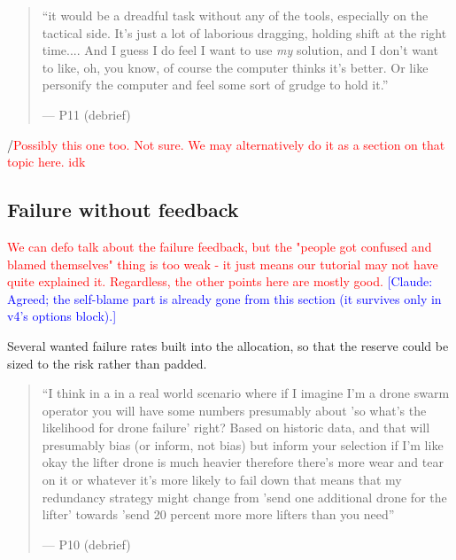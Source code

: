 \begin{quote}\small
``it would be a dreadful task without any of the tools, especially on the tactical side. It's just a lot of laborious dragging, holding shift at the right time.... And I guess I do feel I want to use \textit{my} solution, and I don't want to like, oh, you know, of course the computer thinks it's better. Or like personify the computer and feel some sort of grudge to hold it.''\par\hfill--- P11 (debrief)
\end{quote}
/\textcolor{red}{Possibly this one too. Not sure. We may alternatively do it as a section on that topic here. idk}

\clearpage


\subsection{Failure without feedback}\label{sec:qual:failure}
\textcolor{red}{We can defo talk about the failure feedback, but the "people got confused and blamed themselves" thing is too weak - it just means our tutorial may not have quite explained it. Regardless, the other points here are mostly good.}
\textcolor{blue}{[Claude: Agreed; the self-blame part is already gone from this section (it survives only in v4's options block).]}


\label{sec:qual:failure:blind}
Several wanted failure rates built into the allocation, so that the reserve could be sized to the risk rather than padded.

\begin{quote}\small
``I think in a in a real world scenario where if I imagine I'm a drone swarm operator you will have some numbers presumably about 'so what's the likelihood for drone failure' right? Based on historic data, and that will presumably bias (or inform, not bias) but inform your selection if I'm like okay the lifter drone is much heavier therefore there's more wear and tear on it or whatever it's more likely to fail down that means that my redundancy strategy might change from 'send one additional drone for the lifter' towards 'send 20 percent more more lifters than you need''\par\hfill--- P10 (debrief)
\end{quote}

\clearpage


